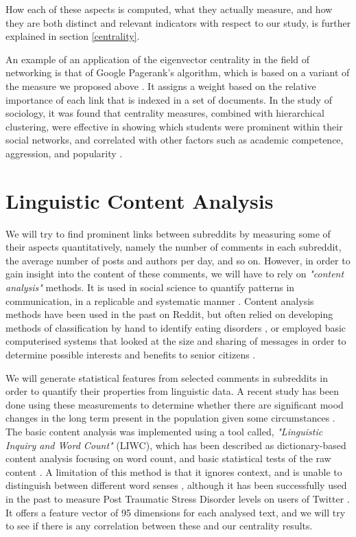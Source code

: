 \documentclass[bsc,frontabs,twoside,singlespacing,parskip,deptreport]{infthesis}
\begin{document}
How each of these aspects is computed, what they actually measure, and how they are both distinct and relevant indicators with respect to our study, is further explained in section \ref{centrality}.

An example of an application of the eigenvector centrality in the field of networking is that of Google Pagerank's algorithm, which is based on a variant of the measure we proposed above \cite{pagerank}. It assigns a weight based on the relative importance of each link that is indexed in a set of documents. In the study of sociology, it was found that centrality measures, combined with hierarchical clustering, were effective in showing which students were prominent within their social networks, and correlated with other factors such as academic competence, aggression, and popularity \cite{xie1999social}.

\section{Linguistic Content Analysis}\label{linguistic-content-analysis}
We will try to find prominent links between subreddits by measuring some of their aspects quantitatively, namely the number of comments in each subreddit, the average number of posts and authors per day, and so on. However, in order to gain insight into the content of these comments, we will have to rely on \textit{"content analysis"} methods. It is used in social science to quantify patterns in communication, in a replicable and systematic manner \cite{BrymanAlan2015Brm}. Content analysis methods have been used in the past on Reddit, but often relied on developing methods of classification by hand to identify eating disorders \cite{sowlesShainaJ.2018Acao}, or employed basic computerised systems that looked at the size and sharing of messages in order to determine possible interests and benefits to senior citizens \cite{nimrodGalit2010SOCA}. 

We will generate statistical features from selected comments in subreddits in order to quantify their properties from linguistic data. A recent study has been done using these measurements to determine whether there are significant mood changes in the long term present in the population given some circumstances \cite{ethayarajhKawin2017TEoP}. The basic content analysis was implemented using a tool called, \textit{"Linguistic Inquiry and Word Count"} (LIWC), which has been described as dictionary-based content analysis focusing on word count, and basic statistical tests of the raw content \cite{lowe2002software} \cite{masters}. A limitation of this method is that it ignores context, and is unable to distinguish between different word senses \cite{ethayarajhKawin2017TEoP}, although it has been successfully used in the past to measure Post Traumatic Stress Disorder levels on users of Twitter \cite{harman2014measuring}. It offers a feature vector of 95 dimensions for each analysed text, and we will try to see if there is any correlation between these and our centrality results.
\end{document}

